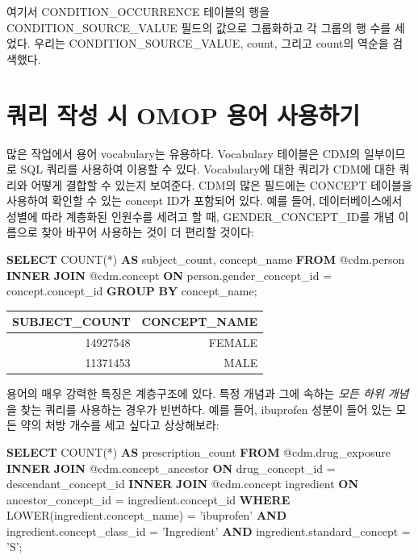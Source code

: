 \documentclass[10.5pt]{book}
\newenvironment{Shaded}{\begin{snugshade}}{\end{snugshade}}
\newcommand{\KeywordTok}[1]{\textcolor[rgb]{0.13,0.29,0.53}{\textbf{#1}}}
\newcommand{\StringTok}[1]{\textcolor[rgb]{0.31,0.60,0.02}{#1}}
\newcommand{\FunctionTok}[1]{\textcolor[rgb]{0.00,0.00,0.00}{#1}}
\newcommand{\NormalTok}[1]{#1}
\theoremstyle{definition}
\theoremstyle{definition}
\theoremstyle{definition}
\theoremstyle{remark}
\begin{document}
여기서 CONDITION\_OCCURRENCE 테이블의 행을 CONDITION\_SOURCE\_VALUE
필드의 값으로 그룹화하고 각 그룹의 행 수를 세었다. 우리는
CONDITION\_SOURCE\_VALUE, count, 그리고 count의 역순을 검색했다.

\section{쿼리 작성 시 OMOP 용어 사용하기}\label{---omop--}

많은 작업에서 용어 vocabulary는 유용하다. Vocabulary 테이블은 CDM의
일부이므로 SQL 쿼리를 사용하여 이용할 수 있다. Vocabulary에 대한 쿼리가
CDM에 대한 쿼리와 어떻게 결합할 수 있는지 보여준다. CDM의 많은 필드에는
CONCEPT 테이블을 사용하여 확인할 수 있는 concept ID가 포함되어 있다.
예를 들어, 데이터베이스에서 성별에 따라 계층화된 인원수를 세려고 할 때,
GENDER\_CONCEPT\_ID를 개념 이름으로 찾아 바꾸어 사용하는 것이 더 편리할
것이다:

\begin{Shaded}
\begin{Highlighting}[]
\KeywordTok{SELECT} \FunctionTok{COUNT}\NormalTok{(*) }\KeywordTok{AS}\NormalTok{ subject_count,}
\NormalTok{  concept_name}
\KeywordTok{FROM}\NormalTok{ @cdm.person}
\KeywordTok{INNER} \KeywordTok{JOIN}\NormalTok{ @cdm.concept}
  \KeywordTok{ON}\NormalTok{ person.gender_concept_id = concept.concept_id}
\KeywordTok{GROUP} \KeywordTok{BY}\NormalTok{ concept_name;}
\end{Highlighting}
\end{Shaded}

\begin{longtable}[]{@{}rr@{}}
\toprule
SUBJECT\_COUNT & CONCEPT\_NAME\tabularnewline
\midrule
\endhead
14927548 & FEMALE\tabularnewline
11371453 & MALE\tabularnewline
\bottomrule
\end{longtable}

용어의 매우 강력한 특징은 계층구조에 있다. 특정 개념과 그에 속하는
\emph{모든 하위 개념}을 찾는 쿼리를 사용하는 경우가 빈번하다. 예를 들어,
ibuprofen 성분이 들어 있는 모든 약의 처방 개수를 세고 싶다고 상상해보라:

\begin{Shaded}
\begin{Highlighting}[]
\KeywordTok{SELECT} \FunctionTok{COUNT}\NormalTok{(*) }\KeywordTok{AS}\NormalTok{ prescription_count}
\KeywordTok{FROM}\NormalTok{ @cdm.drug_exposure}
\KeywordTok{INNER} \KeywordTok{JOIN}\NormalTok{ @cdm.concept_ancestor}
  \KeywordTok{ON}\NormalTok{ drug_concept_id = descendant_concept_id}
\KeywordTok{INNER} \KeywordTok{JOIN}\NormalTok{ @cdm.concept ingredient}
  \KeywordTok{ON}\NormalTok{ ancestor_concept_id = ingredient.concept_id}
\KeywordTok{WHERE} \FunctionTok{LOWER}\NormalTok{(ingredient.concept_name) = }\StringTok{'ibuprofen'}
  \KeywordTok{AND}\NormalTok{ ingredient.concept_class_id = }\StringTok{'Ingredient'}
  \KeywordTok{AND}\NormalTok{ ingredient.standard_concept = }\StringTok{'S'}\NormalTok{;}
\end{Highlighting}
\end{Shaded}
\end{document}
